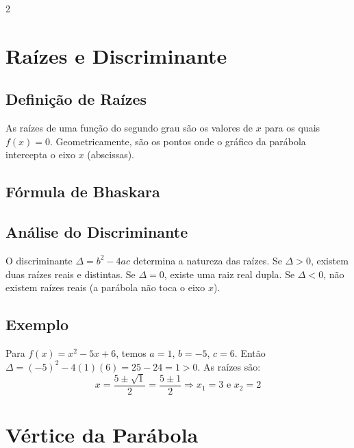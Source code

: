 \documentclass[11pt]{article}
\begin{document}
\begin{multicols}{2}
\section*{Raízes e Discriminante}

\subsection*{Definição de Raízes}
As raízes de uma função do segundo grau são os valores de $x$ para os quais $f(x) = 0$. Geometricamente, são os pontos onde o gráfico da parábola intercepta o eixo $x$ (abscissas).

\subsection*{Fórmula de Bhaskara}

\subsection*{Análise do Discriminante}
O discriminante $\Delta = b^2 - 4ac$ determina a natureza das raízes. Se $\Delta > 0$, existem duas raízes reais e distintas. Se $\Delta = 0$, existe uma raiz real dupla. Se $\Delta < 0$, não existem raízes reais (a parábola não toca o eixo $x$).

\subsection*{Exemplo}
Para $f(x) = x^2 - 5x + 6$, temos $a = 1$, $b = -5$, $c = 6$. Então $\Delta = (-5)^2 - 4(1)(6) = 25 - 24 = 1 > 0$. As raízes são:
\[
x = \frac{5 \pm \sqrt{1}}{2} = \frac{5 \pm 1}{2} \Rightarrow x_1 = 3 \text{ e } x_2 = 2
\]

\section*{Vértice da Parábola}


\end{multicols}
\end{document}
